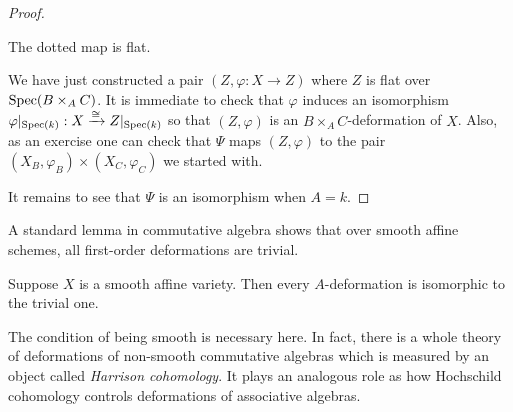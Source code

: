 \documentclass[11pt]{amsart}
\def\Spec{{\rm Spec}}
\begin{document}
\begin{proof}
\begin{lem}
The dotted map is flat.
\end{lem}

We have just constructed a pair $(Z, \varphi : X \to Z)$ where $Z$ is flat over $\Spec(B \times_A C)$. 
It is immediate to check that $\varphi$ induces an isomorphism $\varphi |_{\Spec(k)} : X \xto{\cong} Z|_{\Spec(k)}$ so that $(Z, \varphi)$ is an $B \times_A C$-deformation of $X$. 
Also, as an exercise one can check that $\Psi$ maps $(Z, \varphi)$ to the pair $(X_B, \varphi_B) \times (X_C,\varphi_C)$ we started with.

It remains to see that $\Psi$ is an isomorphism when $A = k$. 
\end{proof}

A standard lemma in commutative algebra shows that over smooth affine schemes, all first-order deformations are trivial. 

\begin{lem}
Suppose $X$ is a smooth affine variety. 
Then every $A$-deformation is isomorphic to the trivial one.
\end{lem}

\begin{rmk}
The condition of being smooth is necessary here. 
In fact, there is a whole theory of deformations of non-smooth commutative algebras which is measured by an object called {\em Harrison cohomology}. 
It plays an analogous role as how Hochschild cohomology controls deformations of associative algebras.
\end{rmk}
\end{document}
